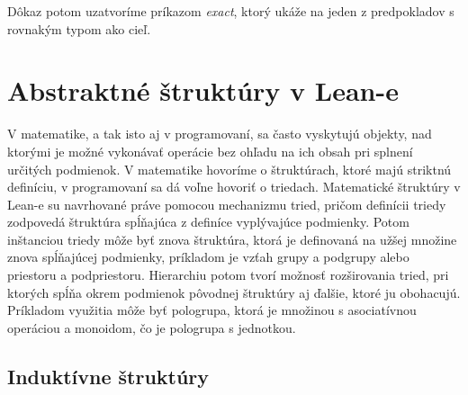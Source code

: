 \documentclass[a4paper,10pt,oneside]{report}%
\begin{document}
Dôkaz potom uzatvoríme príkazom \emph{exact}, ktorý ukáže na jeden z predpokladov
    s rovnakým typom ako cieľ.

\section{Abstraktné štruktúry v Lean-e}
    V matematike, a tak isto aj v programovaní, sa často vyskytujú objekty,
nad ktorými je možné vykonávať operácie bez ohľadu na ich obsah pri splnení
určitých podmienok.
    V matematike hovoríme o štruktúrach, ktoré majú striktnú definíciu, v programovaní
sa dá voľne hovoriť o triedach.
    Matematické štruktúry v Lean-e su navrhované práve pomocou mechanizmu tried,
pričom definícii triedy zodpovedá štruktúra spĺňajúca z definíce vyplývajúce podmienky.
    Potom inštanciou triedy môže byť znova štruktúra, ktorá je definovaná na užšej množine
znova spĺňajúcej podmienky, príkladom je vzťah grupy a podgrupy alebo
priestoru a podpriestoru.
    Hierarchiu potom tvorí možnosť rozširovania tried, pri ktorých spĺňa okrem
podmienok pôvodnej štruktúry aj ďalšie, ktoré ju obohacujú.
    Príkladom využitia môže byť pologrupa, ktorá je množinou s asociatívnou operáciou
a monoidom, čo je pologrupa s jednotkou.
\subsection{Induktívne štruktúry}
\end{document}

